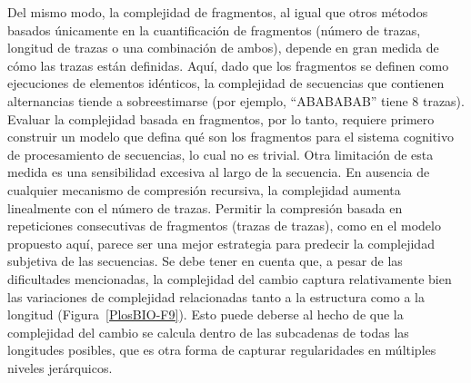 
Del mismo modo, la complejidad de fragmentos, al igual que otros métodos basados únicamente en la cuantificación de fragmentos (número de trazas, longitud de trazas o una combinación de ambos), depende en gran medida de cómo las trazas están definidas. Aquí, dado que los fragmentos se definen como ejecuciones de elementos idénticos, la complejidad de secuencias que contienen alternancias tiende a sobreestimarse (por ejemplo, ``ABABABAB'' tiene 8 trazas). Evaluar la complejidad basada en fragmentos, por lo tanto, requiere primero construir un modelo que defina qué son los fragmentos para el sistema cognitivo de procesamiento de secuencias, lo cual no es trivial. Otra limitación de esta medida es una sensibilidad excesiva al largo de la secuencia. En ausencia de cualquier mecanismo de compresión recursiva, la complejidad aumenta linealmente con el número de trazas. Permitir la compresión basada en repeticiones consecutivas de fragmentos (trazas de trazas), como en el modelo \lot propuesto aquí, parece ser una mejor estrategia para predecir la complejidad subjetiva de las secuencias. Se debe tener en cuenta que, a pesar de las dificultades mencionadas, la complejidad del cambio captura relativamente bien las variaciones de complejidad relacionadas tanto a la estructura como a la longitud (Figura~\ref{PlosBIO-F9}). Esto puede deberse al hecho de que la complejidad del cambio se calcula dentro de las subcadenas de todas las longitudes posibles, que es otra forma de capturar regularidades en múltiples niveles jerárquicos.

